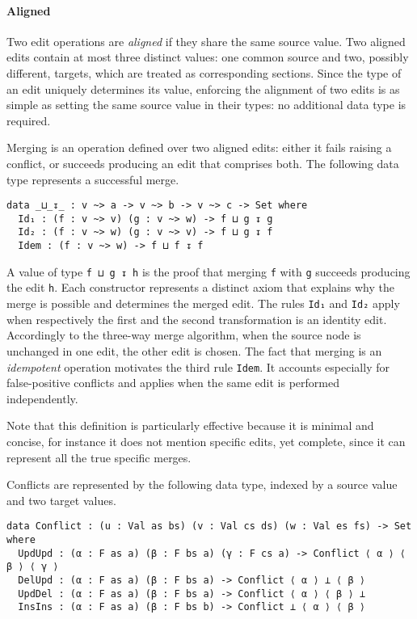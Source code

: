 \documentclass[../Thesis.tex]{subfiles}
\begin{document}
	\paragraph{Aligned}
	Two edit operations are \emph{aligned} if they share the same source value.	
	Two aligned edits contain at most three distinct values: 
	one common source and two, 	possibly different, targets, which 
	are treated as corresponding sections.
	Since the type of an edit uniquely determines its value, enforcing
	the alignment of two edits is as simple as setting the same source value 
	in their types: no additional data type is required.
	
	Merging is an operation defined over two aligned edits:
	either it fails raising a conflict, or succeeds producing an edit that 
	comprises both. 
	The following data type represents a successful merge.

\begin{verbatim}	
data _⊔_↧_ : v ~> a -> v ~> b -> v ~> c -> Set where
  Id₁ : (f : v ~> v) (g : v ~> w) -> f ⊔ g ↧ g
  Id₂ : (f : v ~> w) (g : v ~> v) -> f ⊔ g ↧ f
  Idem : (f : v ~> w) -> f ⊔ f ↧ f
\end{verbatim}

	A value of type \texttt{f ⊔ g ↧ h} is the proof that merging \texttt{f} with
	\texttt{g} succeeds producing the edit \texttt{h}.
	Each constructor represents a distinct axiom that explains why
	the merge is possible and determines the merged edit.
	The rules \texttt{Id₁} and \texttt{Id₂} apply when 
	respectively the first and the second transformation is an identity edit.
	Accordingly to the three-way merge algorithm, when the source node
	is unchanged in one edit, the other edit is chosen.
	The fact that merging is an \emph{idempotent} operation motivates the 
	third rule \texttt{Idem}.
	It accounts especially for false-positive conflicts and applies 
	when the same edit is performed independently.
	
	Note that this definition is particularly effective because it is 
	minimal and concise, for instance it does not mention specific
	edits, yet complete, since it can represent all the true specific merges.

	Conflicts are represented by the following data type, indexed by 
	a source value and two target values.

\begin{verbatim}	
data Conflict : (u : Val as bs) (v : Val cs ds) (w : Val es fs) -> Set where
  UpdUpd : (α : F as a) (β : F bs a) (γ : F cs a) -> Conflict ⟨ α ⟩ ⟨ β ⟩ ⟨ γ ⟩
  DelUpd : (α : F as a) (β : F bs a) -> Conflict ⟨ α ⟩ ⊥ ⟨ β ⟩
  UpdDel : (α : F as a) (β : F bs a) -> Conflict ⟨ α ⟩ ⟨ β ⟩ ⊥ 
  InsIns : (α : F as a) (β : F bs b) -> Conflict ⊥ ⟨ α ⟩ ⟨ β ⟩
\end{verbatim}
	
\end{document}

